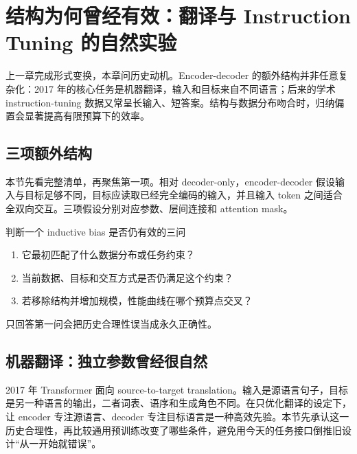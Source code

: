 \section{结构为何曾经有效：翻译与 Instruction Tuning 的自然实验}

上一章完成形式变换，本章问历史动机。Encoder-decoder 的额外结构并非任意复杂化：2017 年的核心任务是机器翻译，输入和目标来自不同语言；后来的学术 instruction-tuning 数据又常呈长输入、短答案。结构与数据分布吻合时，归纳偏置会显著提高有限预算下的效率。

\subsection{三项额外结构}

本节先看完整清单，再聚焦第一项。相对 decoder-only，encoder-decoder 假设输入与目标足够不同，目标应读取已经完全编码的输入，并且输入 token 之间适合全双向交互。三项假设分别对应参数、层间连接和 attention mask。



\begin{importantbox}{判断一个 inductive bias 是否仍有效的三问}
\begin{enumerate}
  \item 它最初匹配了什么数据分布或任务约束？
  \item 当前数据、目标和交互方式是否仍满足这个约束？
  \item 若移除结构并增加规模，性能曲线在哪个预算点交叉？
\end{enumerate}
只回答第一问会把历史合理性误当成永久正确性。
\end{importantbox}

\subsection{机器翻译：独立参数曾经很自然}

2017 年 Transformer 面向 source-to-target translation。输入是源语言句子，目标是另一种语言的输出，二者词表、语序和生成角色不同。在只优化翻译的设定下，让 encoder 专注源语言、decoder 专注目标语言是一种高效先验。本节先承认这一历史合理性，再比较通用预训练改变了哪些条件，避免用今天的任务接口倒推旧设计“从一开始就错误”。


